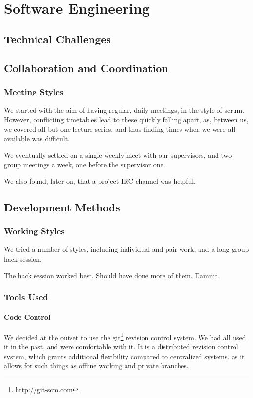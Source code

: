 \chapter{Software Engineering}
\section{Technical Challenges}
\section{Collaboration and Coordination}

  \subsection{Meeting Styles}
    We started with the aim of having regular, daily meetings, in the style of scrum.
    However, conflicting timetables lead to these quickly falling apart, as, between us, we covered all but one lecture series, and thus finding times when we were all available was difficult.

    We eventually settled on a single weekly meet with our supervisors, and two group meetings a week, one before the supervisor one.

    We also found, later on, that a project IRC channel was helpful.


\section{Development Methods}

  \subsection{Working Styles}
    We tried a number of styles, including individual and pair work, and a long group hack session.

    The hack session worked best.
    Should have done more of them.
    Damnit.

  \subsection{Tools Used}
    \subsubsection{Code Control}
      We decided at the outset to use the git\footnote{\url{http://git-scm.com}} revision control system.
      We had all used it in the past, and were comfortable with it.
      It is a distributed revision control system, which grants additional flexibility compared to centralized systems, as it allows for such things as offline working and private branches.

